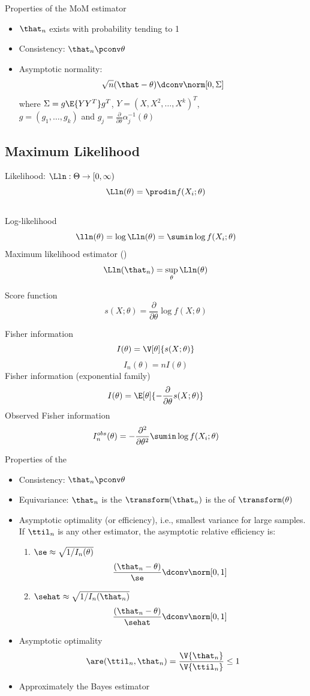 \documentclass[landscape]{article}
\newenvironment{titemize}[1]{
  \begin{minipage}[h]{\columnwidth}
    #1
    \begin{itemize}
}{
    \end{itemize}
  \end{minipage}
}
\begin{document}
\begin{multicols*}{2}
\begin{titemize}{Properties of the MoM estimator}
  \item $\that_n$ exists with probability tending to 1
  \item Consistency: $\that_n \pconv \theta$
  \item Asymptotic normality:
    \[\sqrt{n}(\that-\theta) \dconv \norm[0,\Sigma]\]
    where $\Sigma = g\E{YY^T}g^T$, $Y = (X,X^2,\dots,X^k)^T$,\\
    $g = (g_1,\dots,g_k)$ and
    $g_j = \frac{\partial}{\partial\theta}\alpha_j^{-1}(\theta)$
\end{titemize}

\subsection{Maximum Likelihood}

Likelihood: $\Lln : \Theta \to [0,\infty)$
  \[\Lln(\theta) = \displaystyle\prodin f(X_i;\theta)\] \\
Log-likelihood
  \[\lln(\theta) = \log \Lln(\theta) = \sumin \log f(X_i;\theta)\]
Maximum likelihood estimator (\mle)
\[\Lln(\that_n) = \sup_\theta \Lln(\theta)\]

Score function
\[s(X;\theta) = \frac{\partial}{\partial\theta}\log f(X;\theta)\]

Fisher information
\[I(\theta) = \V[\theta]{s(X;\theta)}\]
\[I_n(\theta) = nI(\theta)\]
Fisher information (exponential family)
\[I(\theta) = \E[\theta]{-\frac{\partial}{\partial\theta} s(X;\theta)}\]
Observed Fisher information
\[I_n^{obs}(\theta)
  = -\frac{\partial^2}{\partial\theta^2} \sumin\log f(X_i;\theta)\]

Properties of the \mle
\begin{itemize}
  \item Consistency: $\that_n \pconv \theta$
  \item Equivariance:
    $\that_n$ is the \mle
    \imp $\transform(\that_n)$ is the \mle of $\transform(\theta)$
  \item Asymptotic optimality (or efficiency), i.e., smallest variance for
    large samples. If $\ttil_n$ is any other estimator, the asymptotic relative
    efficiency is:
    \begin{enumerate}
      \item $\se \approx \sqrt{1/I_n(\theta)}$
        \[\frac{(\that_n - \theta)}{\se} \dconv \norm[0,1]\]
      \item $\sehat \approx \sqrt{1/I_n(\that_n)}$
        \[\frac{(\that_n - \theta)}{\sehat} \dconv \norm[0,1]\]
    \end{enumerate}
  \item Asymptotic optimality
    \[\are(\ttil_n, \that_n)
      = \frac{\V{\that_n}}{\V{\ttil_n}}
      \le 1\]
  \item Approximately the Bayes estimator
\end{itemize}


\end{multicols*}
\end{document}
